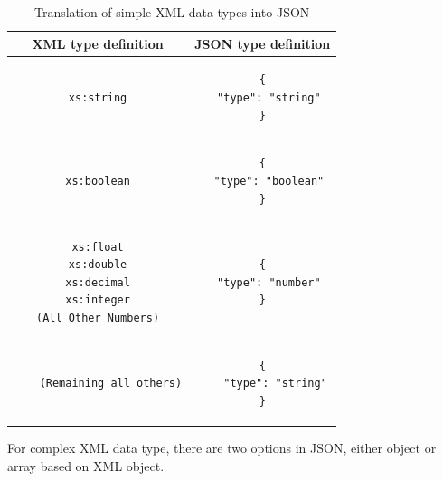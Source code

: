 \documentclass[a4paper,12pt]{article}
\begin{document}
\begin{longtable}{c|c}
\caption{Translation of simple XML data types into JSON}
\label{tbl:xml-json:types}\\

\textbf{XML type definition} & \textbf{JSON type definition}\\
\hline

\begin{minipage}{.4\textwidth}
  \begin{lstlisting}
xs:string
  \end{lstlisting}
\end{minipage} &
\begin{minipage}{.55\textwidth}
\begin{lstlisting}
{
  "type": "string"
}
\end{lstlisting}
\end{minipage}\\

\hline
\begin{minipage}{.4\textwidth}
  \begin{lstlisting}
xs:boolean
  \end{lstlisting}
\end{minipage} &
\begin{minipage}{.55\textwidth}
\begin{lstlisting}
{
  "type": "boolean"
}
\end{lstlisting}
\end{minipage}\\

\hline
\begin{minipage}{.4\textwidth}
  \begin{lstlisting}
xs:float
xs:double
xs:decimal
xs:integer
(All Other Numbers)
  \end{lstlisting}
\end{minipage} &
\begin{minipage}{.55\textwidth}
\begin{lstlisting}
{
  "type": "number"
}
\end{lstlisting}
\end{minipage}\\
\hline

\begin{minipage}{.4\textwidth}
	\begin{lstlisting}
	(Remaining all others)
	\end{lstlisting}
\end{minipage} &
\begin{minipage}{.55\textwidth}
\begin{lstlisting}
{
	"type": "string"
}
\end{lstlisting}
\end{minipage}\\
\end{longtable}
For complex XML data type, there are two options in JSON, either object or array based on XML object.
\end{document}
